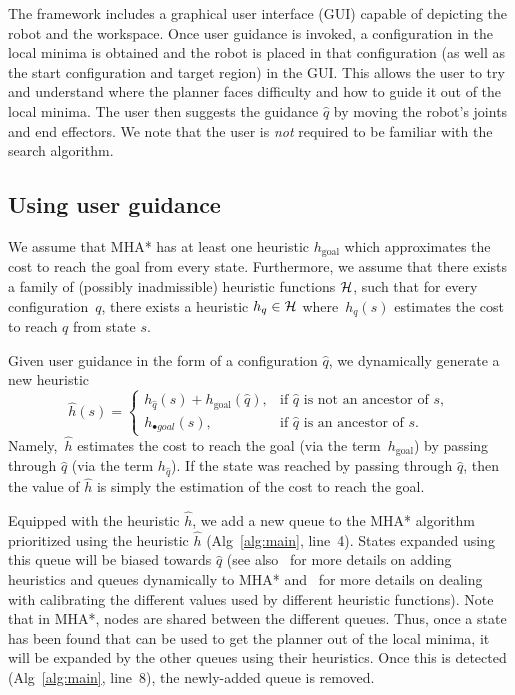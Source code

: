 \documentclass[conference]{IEEEtran}
\begin{document}
The framework includes a graphical user interface (GUI) capable of  depicting the robot and the workspace.
Once user guidance is invoked, 
a configuration in the local minima is obtained and the robot is placed in that configuration (as well as the start configuration and target region) in the GUI.
This allows the user to try and understand where the planner faces difficulty and how to guide it out of the local minima.
The user then suggests the guidance $\hat{q}$ by moving the robot's joints and end effectors.
We note that the user is \emph{not} required to be familiar with the search algorithm.

\subsection{Using user guidance}
\label{sec:q3}



We assume that MHA* has at least one heuristic $h_{\text{goal}}$ which approximates the cost to reach the goal from every state.
Furthermore, we assume that there exists a family of (possibly inadmissible) heuristic functions $\mathcal{H}$, such that for every configuration~$q$, there exists a heuristic $h_q \in \mathcal{H}$ where~$h_q(s)$ estimates the cost to reach $q$ from state $s$.

Given user guidance in the form of a configuration $\hat{q}$, we dynamically generate a new heuristic $$
    \hat{h}(s)= 
\begin{cases}
    h_{\hat{q}}(s) + h_{\text{goal}}(\hat{q}),	& 
    		\text{if } \hat{q} \text{ is not an ancestor of } s,\\
    h_{\textbf{•}{goal}}(s),            		& 
    		\text{if } \hat{q} \text{ is an ancestor of } s.
\end{cases}
$$
Namely,~$\hat{h}$ estimates the 
cost to reach the goal (via the term~$h_{\text{goal}}$) by passing through $\hat{q}$ (via the term $h_{\hat{q}}$). If the state was reached by passing through $\hat{q}$, then the value of $\hat{h}$ is simply the estimation of the cost to reach the goal.


Equipped with the heuristic $\hat{h}$, we add a new queue to the MHA* algorithm prioritized using the heuristic $\hat{h}$ (Alg~\ref{alg:main}, line~4). 
States expanded using this queue will be biased towards $\hat{q}$ (see also~\cite{INL15} for more details on adding heuristics and queues dynamically to MHA*
and~\cite{NAL15} for more details on dealing with calibrating the different values used by different heuristic functions).
Note that in MHA*, nodes are shared between the different queues.
Thus, once a state has been found that can be used to get the planner out of the local minima, it will be expanded by the other queues using their heuristics.
Once this is detected (Alg~\ref{alg:main}, line~8), the newly-added queue is removed.
\end{document}
